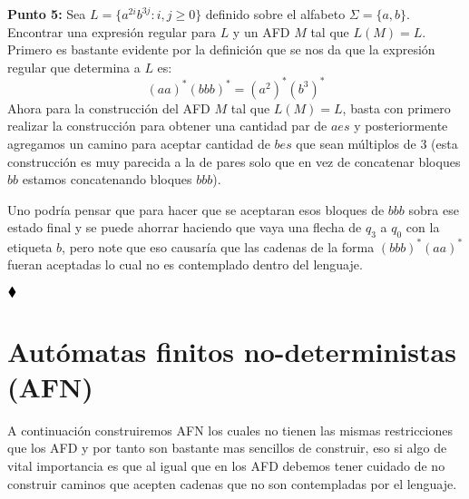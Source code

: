 \textbf{Punto 5: }Sea $L=\{a^{2i}b^{3j}:i,j\geq0\}$ definido sobre el alfabeto $\Sigma=\{a,b\}.$ Encontrar una expresión regular para $L$ y un AFD $M$ tal que $L(M)=L.$\\

 Primero es bastante evidente por la definición que se nos da que la expresión regular que determina a $L$ es:
$$(aa)^*(bbb)^*=\left(a^2\right)^*\left(b^3\right)^*$$
Ahora para la construcción del AFD $M$ tal que $L(M)=L$, basta con primero realizar la construcción para obtener una cantidad par de $aes$ y posteriormente agregamos un camino para aceptar cantidad de $bes$ que sean múltiplos de $3$ (esta construcción es muy parecida a la de pares solo que en vez de concatenar bloques $bb$ estamos concatenando bloques $bbb$).
    \begin{basedtikz}
    \centering
    \end{basedtikz}
    Uno podría pensar que para hacer que se aceptaran esos bloques de $bbb$ sobra ese estado final y se puede ahorrar haciendo que vaya una flecha de $q_3$ a $q_0$ con la etiqueta $b$, pero note que eso causaría que las cadenas de la forma $(bbb)^*(aa)^*$ fueran aceptadas lo cual no es contemplado dentro del lenguaje.
    
    $\hfill \blacklozenge$

    \section{Autómatas finitos no-deterministas (AFN)} 

  A continuación construiremos AFN los cuales no tienen las mismas restricciones que los AFD y por tanto son bastante mas sencillos de construir, eso si algo de vital importancia es que al igual que en los AFD debemos tener cuidado de no construir caminos que acepten cadenas que no son contempladas por el lenguaje.\\

